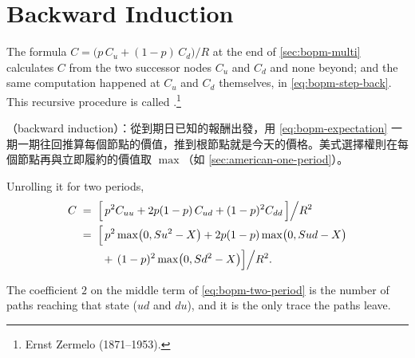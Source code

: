 \section{Backward Induction}
\label{sec:backward-induction}


The formula $C=\bigl(p\,C_{u}+(1-p)\,C_{d}\bigr)/R$ at the end of \autoref{sec:bopm-multi} calculates $C$ from the two successor nodes $C_{u}$ and $C_{d}$ and none beyond; and the same computation happened at $C_{u}$ and $C_{d}$ themselves, in \eqref{eq:bopm-step-back}.
This recursive procedure is called .\footnote{Ernst Zermelo (1871--1953).}

\begin{remark}
	（backward induction）：從到期日已知的報酬出發，用 \eqref{eq:bopm-expectation} 一期一期往回推算每個節點的價值，推到根節點就是今天的價格。美式選擇權則在每個節點再與立即履約的價值取 $\max$（如 \autoref{sec:american-one-period}）。
\end{remark}

Unrolling it for two periods,
\begin{equation}
	\begin{aligned}
		C & \;=\; \Bigl[\,p^{2}C_{uu}+2p(1-p)\,C_{ud}+(1-p)^{2}C_{dd}\,\Bigr]\Big/R^{2}                        \\
		  & \;=\; \Bigl[\,p^{2}\max\bigl(0,Su^{2}-X\bigr)+2p(1-p)\max\bigl(0,Sud-X\bigr)                       \\
		  & \hphantom{\;=\;\Bigl[\,}+\,(1-p)^{2}\max\bigl(0,Sd^{2}-X\bigr)\Bigr]\Big/R^{2} .
	\end{aligned}
	\label{eq:bopm-two-period}
\end{equation}

\suppstart
The coefficient $2$ on the middle term of \eqref{eq:bopm-two-period} is the number of paths reaching that state ($ud$ and $du$), and it is the only trace the paths leave.
\suppend

